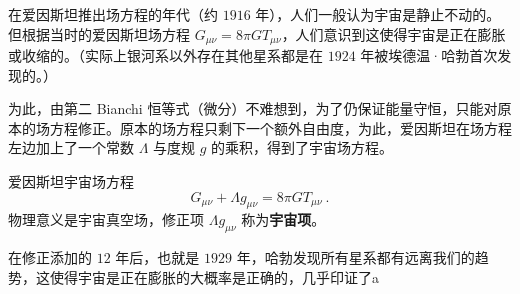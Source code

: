 

在爱因斯坦推出场方程的年代（约 $1916$ 年），人们一般认为宇宙是静止不动的。但根据当时的爱因斯坦场方程 $ G_{\mu \nu} = 8 \pi G  T_{\mu \nu}$，人们意识到这使得宇宙是正在膨胀或收缩的。（实际上银河系以外存在其他星系都是在 $1924$ 年被埃德温·哈勃首次发现的。）

为此，由第二 Bianchi 恒等式（微分）不难想到，为了仍保证能量守恒，只能对原本的场方程修正。原本的场方程只剩下一个额外自由度，为此，爱因斯坦在场方程左边加上了一个常数 $\Lambda$ 与度规 $g$ 的乘积，得到了宇宙场方程。

\begin{theorem}{爱因斯坦宇宙场方程}
$$G_{\mu \nu} + \Lambda g_{\mu \nu} = 8\pi G T_{\mu \nu} ~.$$
物理意义是宇宙真空场，修正项 $\Lambda g_{\mu \nu}$ 称为\textbf{宇宙项}。
\end{theorem}

在修正添加的 $12$ 年后，也就是 $1929$ 年，哈勃发现所有星系都有远离我们的趋势，这使得宇宙是正在膨胀的大概率是正确的，几乎印证了a